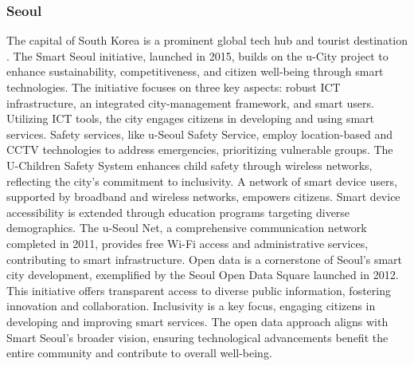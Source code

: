 \subsubsection{Seoul} 
The capital of South Korea is a prominent global tech hub and tourist destination \cite{Hwang2013}. The Smart Seoul initiative, launched in 2015, builds on the u-City project to enhance sustainability, competitiveness, and citizen well-being through smart technologies. The initiative focuses on three key aspects: robust ICT infrastructure, an integrated city-management framework, and smart users. Utilizing ICT tools, the city engages citizens in developing and using smart services.
Safety services, like u-Seoul Safety Service, employ location-based and CCTV technologies to address emergencies, prioritizing vulnerable groups. The U-Children Safety System enhances child safety through wireless networks, reflecting the city's commitment to inclusivity. A network of smart device users, supported by broadband and wireless networks, empowers citizens. Smart device accessibility is extended through education programs targeting diverse demographics.
The u-Seoul Net, a comprehensive communication network completed in 2011, provides free Wi-Fi access and administrative services, contributing to smart infrastructure. Open data is a cornerstone of Seoul's smart city development, exemplified by the Seoul Open Data Square \cite{SeoulOpenData} launched in 2012. This initiative offers transparent access to diverse public information, fostering innovation and collaboration. Inclusivity is a key focus, engaging citizens in developing and improving smart services. The open data approach aligns with Smart Seoul's broader vision, ensuring technological advancements benefit the entire community and contribute to overall well-being.


